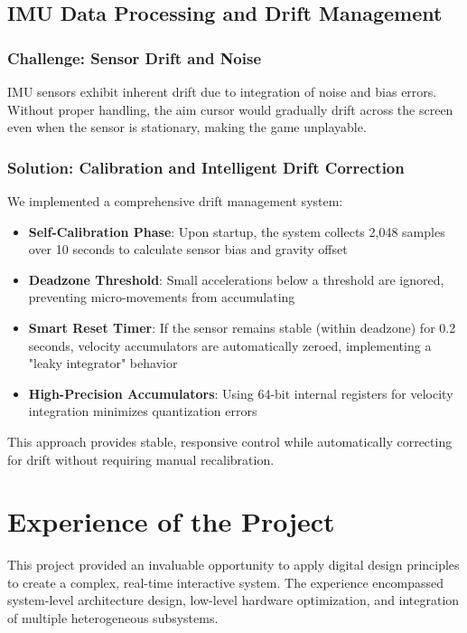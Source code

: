 \documentclass[12pt,a4paper]{article}
\begin{document}
\subsection{IMU Data Processing and Drift Management}

\subsubsection{Challenge: Sensor Drift and Noise}
IMU sensors exhibit inherent drift due to integration of noise and bias errors. Without proper handling, the aim cursor would gradually drift across the screen even when the sensor is stationary, making the game unplayable.

\subsubsection{Solution: Calibration and Intelligent Drift Correction}
We implemented a comprehensive drift management system:
\begin{itemize}
    \item \textbf{Self-Calibration Phase}: Upon startup, the system collects 2,048 samples over 10 seconds to calculate sensor bias and gravity offset
    \item \textbf{Deadzone Threshold}: Small accelerations below a threshold are ignored, preventing micro-movements from accumulating
    \item \textbf{Smart Reset Timer}: If the sensor remains stable (within deadzone) for 0.2 seconds, velocity accumulators are automatically zeroed, implementing a "leaky integrator" behavior
    \item \textbf{High-Precision Accumulators}: Using 64-bit internal registers for velocity integration minimizes quantization errors
\end{itemize}

This approach provides stable, responsive control while automatically correcting for drift without requiring manual recalibration.

\section{Experience of the Project}

This project provided an invaluable opportunity to apply digital design principles to create a complex, real-time interactive system. The experience encompassed system-level architecture design, low-level hardware optimization, and integration of multiple heterogeneous subsystems.
\end{document}
